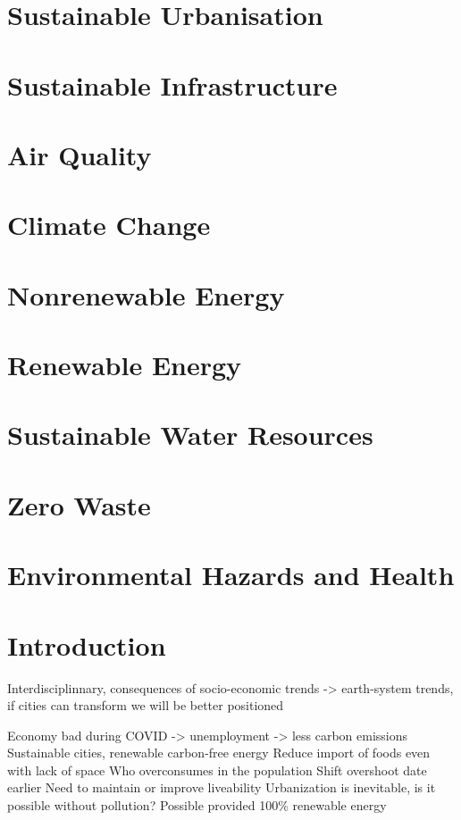 \documentclass[12pt, a4paper]{article}
\begin{document}
\begin{multicols*}{3}
\section{Sustainable Urbanisation}
\section{Sustainable Infrastructure}
\section{Air Quality}
\section{Climate Change}
\section{Nonrenewable Energy}
\section{Renewable Energy}
\section{Sustainable Water Resources}
\section{Zero Waste}
\section{Environmental Hazards and Health}

\section{Introduction}
Interdisciplinnary, consequences of socio-economic trends -> earth-system trends, if cities can transform we will be better positioned

Economy bad during COVID -> unemployment -> less carbon emissions
Sustainable cities, renewable carbon-free energy 
Reduce import of foods even with lack of space
Who overconsumes in the population
Shift overshoot date earlier
Need to maintain or improve liveability
Urbanization is inevitable, is it possible without pollution? Possible provided 100\% renewable energy

\colbreak
\end{multicols*}
\end{document}
